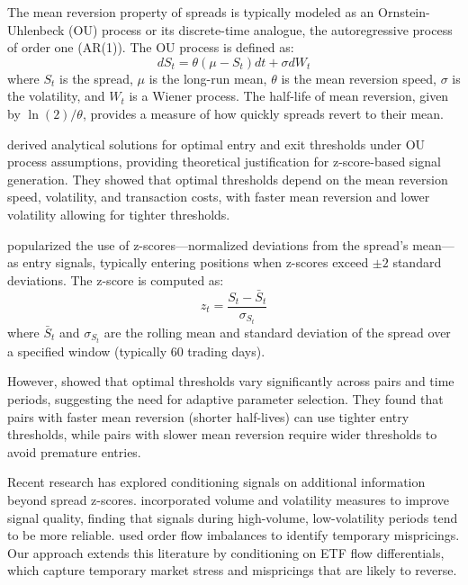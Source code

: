 \documentclass[12pt]{article}
\begin{document}
The mean reversion property of spreads is typically modeled as an Ornstein-Uhlenbeck (OU) process or its discrete-time analogue, the autoregressive process of order one (AR(1)). The OU process is defined as:
\begin{equation}
dS_t = \theta(\mu - S_t)dt + \sigma dW_t
\end{equation}
where $S_t$ is the spread, $\mu$ is the long-run mean, $\theta$ is the mean reversion speed, $\sigma$ is the volatility, and $W_t$ is a Wiener process. The half-life of mean reversion, given by $\ln(2)/\theta$, provides a measure of how quickly spreads revert to their mean.

\citet{bertram2010analytical} derived analytical solutions for optimal entry and exit thresholds under OU process assumptions, providing theoretical justification for z-score-based signal generation. They showed that optimal thresholds depend on the mean reversion speed, volatility, and transaction costs, with faster mean reversion and lower volatility allowing for tighter thresholds.

\citet{vidyamurthy2004pairs} popularized the use of z-scores—normalized deviations from the spread's mean—as entry signals, typically entering positions when z-scores exceed $\pm 2$ standard deviations. The z-score is computed as:
\begin{equation}
z_t = \frac{S_t - \bar{S}_t}{\sigma_{S_t}}
\end{equation}
where $\bar{S}_t$ and $\sigma_{S_t}$ are the rolling mean and standard deviation of the spread over a specified window (typically 60 trading days).

However, \citet{do2006pairs} showed that optimal thresholds vary significantly across pairs and time periods, suggesting the need for adaptive parameter selection. They found that pairs with faster mean reversion (shorter half-lives) can use tighter entry thresholds, while pairs with slower mean reversion require wider thresholds to avoid premature entries.

Recent research has explored conditioning signals on additional information beyond spread z-scores. \citet{chen2012pairs} incorporated volume and volatility measures to improve signal quality, finding that signals during high-volume, low-volatility periods tend to be more reliable. \citet{avellaneda2010statistical} used order flow imbalances to identify temporary mispricings. Our approach extends this literature by conditioning on ETF flow differentials, which capture temporary market stress and mispricings that are likely to reverse.
\end{document}
